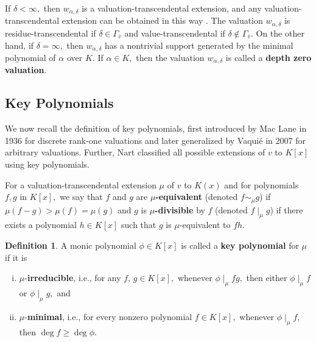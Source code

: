 \documentclass[11pt]{amsart}
\theoremstyle{definition}
\newtheorem{definition}[theorem]{Definition}
\theoremstyle{remark}
\numberwithin{equation}{section}
\begin{document}
If  $\delta<\infty,$ then $w_{\alpha,\delta}$ is a valuation-transcendental extension, and any valuation-transcendental extension can be obtained in this way \cite[Corollary 3.7]{W}. The valuation $w_{\alpha,\delta}$ is residue-transcendental if $\delta\in\Gamma_{\overline{v}}$ and value-transcendental if $\delta\notin\Gamma_{\overline{v}}$. On the other hand, if $\delta=\infty,$ then $w_{\alpha,\delta}$ has a nontrivial support generated by the minimal polynomial of $\alpha$ over $K.$ If $\alpha\in K,$ then the valuation $w_{\alpha,\delta}$ is called a {\bf depth zero valuation}.

\subsection{Key Polynomials}

We now recall the definition of key polynomials, first introduced by Mac Lane \cite{M} in 1936 for discrete rank-one valuations and later generalized by Vaqui\'e \cite{V} in 2007 for arbitrary valuations. Further, Nart \cite{EN1} classified all possible extensions of $v$ to $K[x]$ using key polynomials.

For a valuation-transcendental extension  $\mu$ of $v$ to $K(x)$ and for polynomials $f,g$ in $K[x],$ we say that $f$ and $g$ are {\bf $\mu$-equivalent} (denoted $f\sim_\mu g$)  if $\mu(f-g)>\mu(f)=\mu(g)$ and $g$ is {\bf $\mu$-divisible} by $f$ (denoted $f\mid_{\mu} g$)  if there exists a polynomial $h \in K[x]$ such that $g$ is $\mu$-equivalent to $fh.$

		\begin{definition}
		A monic polynomial $\phi\in K[x]$   is called a  {\bf  key polynomial} for $\mu$ if it is
		\begin{enumerate}[(i)]
			\item  $\mu$-{\bf irreducible}, i.e., for any $f,\, g\in K[x],$ whenever $\phi\mid_{\mu} fg,$ then either $\phi\mid_{\mu}f $ or $\phi\mid_{\mu}g,$ and 
			\item $\mu$-{\bf minimal}, i.e., for every nonzero polynomial $f\in K[x],$ whenever $\phi\mid_{\mu}f,$ then $\deg f\geq \deg \phi.$
		\end{enumerate}
	\end{definition}
	
\end{document}
